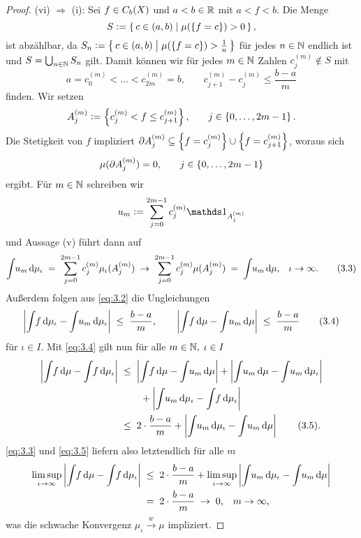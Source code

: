 \documentclass[../main/main.tex]{subfiles}
\begin{document}
\begin{proof}
		(vi) $\Rightarrow$ (i): Sei $f \in C_b(X)$ und $a < b \in \mathbb{R}$ 
		mit $a < f < b$. Die Menge
		$$S \vcentcolon = \left\{\, c \in (a, b) \; \middle| \; \mu(\left\{f = c\right\}) > 0 \,\right\} \text{,}$$
		ist abzählbar, da 
		$S_n \vcentcolon = \left\{\, c \in (a, b) \; \middle| \; \mu(\left\{f = c\right\}) > \frac{1}{n} \,\right\}$ 
		für jedes $n \in \mathbb{N}$ endlich ist und $S = \bigcup_{n \in \mathbb{N}} S_n$ gilt.
		Damit können wir für jedes $m \in \mathbb{N}$ Zahlen $c_j^{(m)} \notin S$ mit
		\[a = c_0^{(m)} < \dots < c_{2m}^{(m)} = 
		b \text{,} \qquad c_{j+1}^{(m)} - c_j^{(m)} \leq \frac{b-a}{m} 
		\label{eq:3.2} \tag{3.2}\]
		finden. Wir setzen
		$$A_j^{(m)} \vcentcolon = \left\{c_j^{(m)} < f \leq c_{j+1}^{(m)}\right\}\text{,}
		\qquad j \in \left\{0,\dots,2m-1\right\} \text{.}$$ 
		Die Stetigkeit von $f$ impliziert 
		$\partial A_j^{(m)} \subseteq \left\{f = c_j^{(m)}\right\} \cup \left\{f = c_{j+1}^{(m)}\right\}$, 
		woraus sich 
		$$\mu(\partial A_j^{(m)}) = 0 \text{,} \qquad j \in \left\{0,\dots,2m-1\right\}$$
		ergibt. Für $m \in \mathbb{N}$ schreiben wir
		$$u_m \defby \sum_{j=0}^{2m-1} c_j^{(m)} \indfct_{A_j^{(m)}}$$
		und Aussage (v) führt dann auf
		\[\int_{} \, u_m \, \mathrm{d}\mu_\iota \; = \; \sum_{j=0}^{2m-1} c_j^{(m)} \mu_\iota(A_j^{(m)}) 
		\; \to \; \sum_{j=0}^{2m-1} c_j^{(m)} \mu(A_j^{(m)}) \; = \; 
		\int_{} \, u_m \, \mathrm{d}\mu \text{,} \quad \iota \to \infty \text{.} 
		\label{eq:3.3} \tag{3.3}\]
		Außerdem folgen aus \eqref{eq:3.2} die Ungleichungen
		\[\left| \int_{} \, f \, \mathrm{d}\mu_\iota - \int_{} \, u_m \, \mathrm{d}\mu_\iota \right| \; \leq \; 
		\frac{b-a}{m} \text{,} \qquad 
		\left| \int_{} \, f \, \mathrm{d}\mu - \int_{} \, u_m \, \mathrm{d}\mu \right| \; \leq \; 
		\frac{b-a}{m} \label{eq:3.4} \tag{3.4}\]
		für $\iota \in I$.
		Mit \eqref{eq:3.4} gilt nun für alle $m \in \mathbb{N}, \; \iota \in I$
		\begin{align*}
			\left| \int_{} \, f \, \mathrm{d}\mu - \int_{} \, f \, \mathrm{d}\mu_\iota \right| \; &\leq \; 
			\left| \int_{} \, f \, \mathrm{d}\mu - \int_{} \, u_m \, \mathrm{d}\mu \right| + 
			\left| \int_{} \, u_m \, \mathrm{d}\mu - \int_{} \, u_m \, \mathrm{d}\mu_\iota \right| \\ & \qquad + 
			\left| \int_{} \, u_m \, \mathrm{d}\mu_\iota - \int_{} \, f \, \mathrm{d}\mu_\iota \right| \\
			&\leq \; 2 \cdot \frac{b-a}{m} + \left| \int_{} \, u_m \, \mathrm{d}\mu_\iota - 
			\int_{} \, u_m \, \mathrm{d}\mu \right| \label{eq:3.5} \tag{3.5}\text{.}
		\end{align*}
		\eqref{eq:3.3} und \eqref{eq:3.5} liefern also letztendlich für alle $m$
		\begin{align*}
			\limsup_{\iota \to \infty} \left| \int_{} \, f \, \mathrm{d}\mu - 
			\int_{} \, f \, \mathrm{d}\mu_\iota \right|
			\; &\leq \; 2 \cdot \frac{b-a}{m} + 
			\limsup_{\iota \to \infty} \left| \int_{} \, u_m \, \mathrm{d}\mu_\iota - 
			\int_{} \, u_m \, \mathrm{d}\mu \right| \\
			&= \; 2 \cdot \frac{b-a}{m} \; \to \; 0 \text{,} 
			\quad m \to \infty \text{,}
		\end{align*}
		was die schwache Konvergenz $\mu_\iota \xrightarrow{w} \mu$ impliziert.
	\end{proof}
\end{document}
